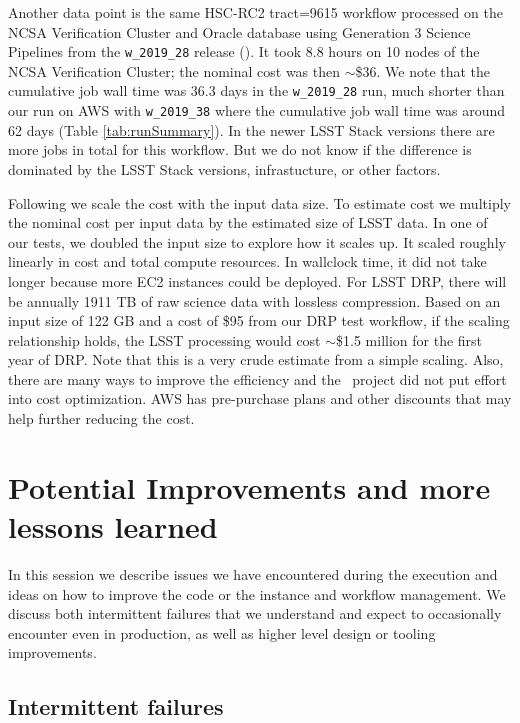 Another data point is the same HSC-RC2 tract=9615 workflow processed on the NCSA Verification Cluster and Oracle database using Generation 3 Science Pipelines from the \texttt{w\_2019\_28} release ().
It took 8.8 hours on 10 nodes of the NCSA Verification Cluster; the nominal cost was then $\sim$\$36.
We note that the cumulative job wall time was 36.3 days in the \texttt{w\_2019\_28} run, much shorter than our run on AWS with \texttt{w\_2019\_38} where the cumulative job wall time was around 62 days (Table \ref{tab:runSummary}).
In the newer LSST Stack versions there are more jobs in total for this workflow.
But we do not know if the difference is dominated by the LSST Stack versions, infrastucture, or other factors.

Following  we scale the cost with the input data size.
To estimate cost we multiply the nominal cost per input data by the estimated size of LSST data.
In one of our tests, we doubled the input size to explore how it scales up.
It scaled roughly linearly in cost and total compute resources.
In wallclock time, it did not take longer because more EC2 instances could be deployed.
For LSST DRP, there will be annually 1911 TB of raw science data with lossless compression.
Based on an input size of 122 GB and a cost of \$95 from our DRP test workflow, if the scaling relationship holds, the LSST processing would cost $\sim$\$1.5 million for the first year of DRP.
Note that this is a very crude estimate from a simple scaling.
Also, there are many ways to improve the efficiency and the \poc~project did not put effort into cost optimization.
AWS has pre-purchase plans and other discounts that may help further reducing the cost.


\section{Potential Improvements and more lessons learned} \label{sec:future}

In this session we describe issues we have encountered during the execution and ideas on how to improve the code or the instance and workflow management.
We discuss both intermittent failures that we understand and expect to occasionally encounter even in production, as well as higher level design or tooling improvements.

\subsection{Intermittent failures}

